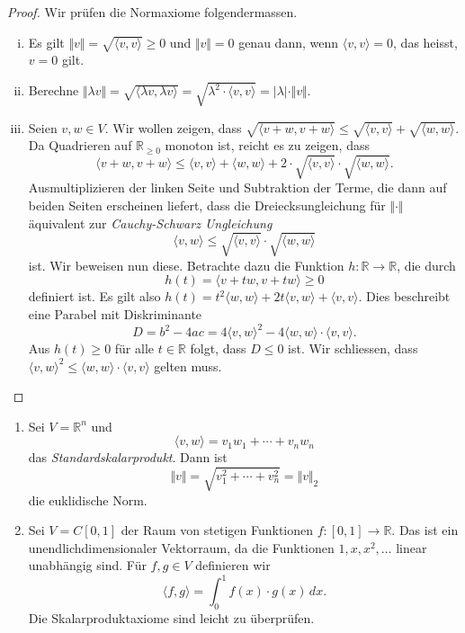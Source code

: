 \documentclass[../main.tex]{subfiles}
\begin{document}
\begin{proof}
  Wir prüfen die Normaxiome folgendermassen.
  \begin{enumerate}[(i)]
    \item Es gilt $\Vert v \Vert = \sqrt{\langle v, v \rangle} \geq 0$
      und $\Vert v \Vert = 0$ genau dann, wenn
      $\langle v, v \rangle = 0$, das heisst, $v = 0$ gilt.
    \item Berechne $\Vert \lambda v \Vert = \sqrt{\langle \lambda v,
      \lambda v\rangle}
      = \sqrt{\lambda^2 \cdot \langle v, v \rangle} = |\lambda| \cdot
      \Vert v \Vert$.
    \item Seien $v, w \in V$. Wir wollen zeigen, dass
      $\sqrt{\langle v + w, v + w \rangle} \leq
      \sqrt{\langle v, v \rangle} + \sqrt{\langle w, w \rangle}$.
      Da Quadrieren auf $\mathbb{R}_{\geq 0}$ monoton ist,
      reicht es zu zeigen, dass
      \[
      \langle v + w, v+ w \rangle\leq \langle v, v \rangle
      + \langle w, w \rangle + 2 \cdot \sqrt{\langle v, v \rangle} \cdot
      \sqrt{\langle w, w \rangle}.
      \]
      Ausmultiplizieren der linken Seite und Subtraktion der Terme,
      die dann auf beiden Seiten erscheinen liefert, dass
      die Dreiecksungleichung für $\Vert \cdot \Vert$ äquivalent
      zur \emph{Cauchy-Schwarz Ungleichung}
      \[
        \langle v, w \rangle \leq \sqrt{\langle v, v \rangle}
        \cdot \sqrt{\langle w, w \rangle}
      \]
      ist.
      Wir beweisen nun diese.
      Betrachte dazu die Funktion $h \colon \mathbb{R} \to \mathbb{R}$,
      die durch
      \[
        h(t) = \langle v + tw, v + tw \rangle \geq 0
      \]
      definiert ist.
      Es gilt also $h(t) = t^2 \langle w, w \rangle + 2t \langle v, w \rangle
      + \langle v, v \rangle$.
      Dies beschreibt eine Parabel mit Diskriminante
      \[
        D = b^2 - 4ac = 4\langle v, w \rangle^2 - 4\langle w, w \rangle
        \cdot \langle v, v \rangle.
      \]
      Aus $h(t) \geq 0$ für alle $t \in \mathbb{R}$ folgt, dass
      $D \leq 0$ ist.
      Wir schliessen, dass $\langle v, w \rangle^2 \leq \langle w, w \rangle
      \cdot \langle v, v \rangle$ gelten muss.
      \qedhere
  \end{enumerate}
\end{proof}

\begin{examples}
  \leavevmode
  \begin{enumerate}[(1)]
    \item Sei $V = \mathbb{R}^n$ und
      \[
        \langle v, w \rangle = v_1 w_1 + \cdots + v_n w_n
      \]
      das \emph{Standardskalarprodukt}.
      Dann ist
      \[
        \Vert v \Vert = \sqrt{v_1^2 + \cdots + v_n^2} = \Vert v \Vert_2
      \]
      die euklidische Norm.
    \item Sei $V = C[0, 1]$ der Raum von stetigen Funktionen
      $f \colon[0, 1] \to \mathbb{R}$.
      Das ist ein unendlichdimensionaler Vektorraum,
      da die Funktionen $1, x, x^2, \dots$ linear unabhängig sind.
      Für $f, g \in V$ definieren wir
      \[
        \langle f, g \rangle = \int_{0}^{1} f(x) \cdot g(x) \, dx.
      \]
      Die Skalarproduktaxiome sind leicht zu überprüfen.
  \end{enumerate}
\end{examples}
\end{document}
